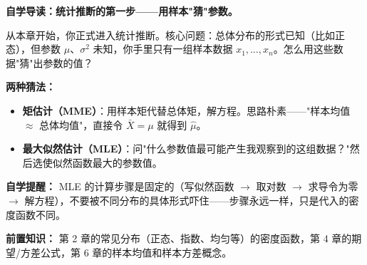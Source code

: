 ﻿\documentclass[lang=cn,11pt]{elegantbook}
\begin{document}
\begin{note}
\textbf{自学导读：统计推断的第一步——用样本"猜"参数。}

从本章开始，你正式进入统计推断。核心问题：总体分布的形式已知（比如正态），但参数 $\mu$、$\sigma^2$ 未知，你手里只有一组样本数据 $x_1,\dots,x_n$。怎么用这些数据"猜"出参数的值？

\textbf{两种猜法：}
\begin{itemize}
    \item \textbf{矩估计（MME）}：用样本矩代替总体矩，解方程。思路朴素——"样本均值 $\approx$ 总体均值"，直接令 $\bar{X}=\mu$ 就得到 $\hat\mu$。
    \item \textbf{最大似然估计（MLE）}：问"什么参数值最可能产生我观察到的这组数据？"然后选使似然函数最大的参数值。
\end{itemize}

\textbf{自学提醒：} MLE 的计算步骤是固定的（写似然函数 $\to$ 取对数 $\to$ 求导令为零 $\to$ 解方程），不要被不同分布的具体形式吓住——步骤永远一样，只是代入的密度函数不同。

\textbf{前置知识：} 第 2 章的常见分布（正态、指数、均匀等）的密度函数，第 4 章的期望/方差公式，第 6 章的样本均值和样本方差概念。
\end{note}
\end{document}
